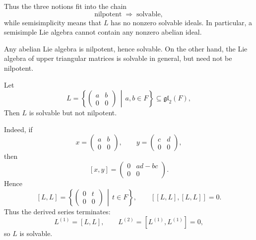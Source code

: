 \begin{remark}
    Thus the three notions fit into the chain
    \[
        \text{nilpotent} \;\Longrightarrow\; \text{solvable},
    \]
    while semisimplicity means that \(L\) has no nonzero solvable ideals. In particular, a semisimple Lie algebra cannot contain any nonzero abelian ideal.
\end{remark}

\begin{example}
    Any abelian Lie algebra is nilpotent, hence solvable. On the other hand, the Lie algebra of upper triangular matrices is solvable in general, but need not be nilpotent.
\end{example}

\begin{example}
    Let
    \[
        L=
        \left\{
        \begin{pmatrix}
            a & b \\
            0 & 0
        \end{pmatrix}
        \,\middle|\,
        a,b\in F
        \right\}
        \subseteq \mathfrak{gl}_2(F),
    \]
    Then \(L\) is solvable but not nilpotent.

    Indeed, if
    \[
        x=
        \begin{pmatrix}
            a & b \\
            0 & 0
        \end{pmatrix},
        \qquad
        y=
        \begin{pmatrix}
            c & d \\
            0 & 0
        \end{pmatrix},
    \]
    then
    \[
        [x,y]
        =
        \begin{pmatrix}
            0 & ad-bc \\
            0 & 0
        \end{pmatrix}.
    \]
    Hence
    \[
        [L,L]
        =
        \left\{
        \begin{pmatrix}
            0 & t \\
            0 & 0
        \end{pmatrix}
        \,\middle|\,
        t\in F
        \right\},
        \qquad
        [[L,L],[L,L]]=0.
    \]
    Thus the derived series terminates:
    \[
        L^{(1)}=[L,L],\qquad L^{(2)}=[L^{(1)},L^{(1)}]=0,
    \]
    so \(L\) is solvable.


\end{example}
